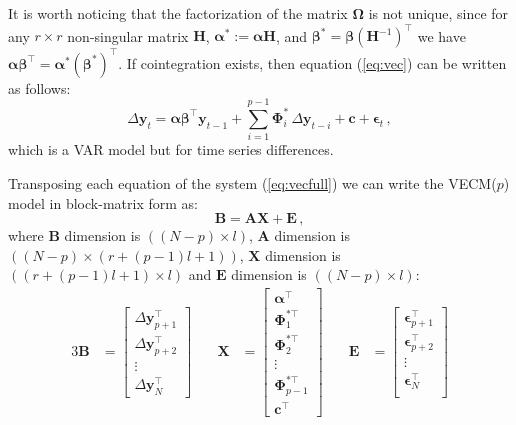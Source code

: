 \documentclass[twocolumn]{svjour3}          %
\begin{document}
It is worth noticing that the factorization of the matrix
$\boldsymbol\Omega$ is not unique, since for any $r \times r$
non-singular matrix $\mathbf{H}$, $\boldsymbol{\alpha}^*:=\boldsymbol{\alpha}\mathbf{H}$,
and $\boldsymbol{\beta}^*=\boldsymbol{\beta}(\mathbf{H}^{-1})^\top$ we have
$\boldsymbol{\alpha\beta}^\top=\boldsymbol{\alpha}^*(\boldsymbol{\beta}^*)^\top$.
If cointegration exists, then equation (\ref{eq:vec}) can be written
as follows:
\begin{equation}\label{eq:vecfull}
\Delta\mathbf{y}_t 
= \boldsymbol{\alpha\beta}^\top\mathbf{y}_{t-1} 
  + \sum_{i=1}^{p-1}\boldsymbol{\Phi}_i^*\,\Delta\mathbf{y}_{t-i}
  + \mathbf{c} + \boldsymbol{\epsilon}_t\,,
\end{equation}
\noindent
which is a VAR model but for time series differences.


Transposing each equation of the system (\ref{eq:vecfull}) we can write
the VECM($p$) model in block-matrix form as:
\begin{equation}\label{eq:vareq}
\mathbf{B} = 
\mathbf{A} \mathbf{X} + 
\mathbf{E} \, , 
\end{equation}
%
\noindent where $\mathbf{B}$ dimension is $((N-p)\times l)$, $\mathbf{A}$
dimension is $((N-p)\times(r+(p-1)l +1))$, $\mathbf{X}$ dimension is $((r+(p-1)l
+1)\times l)$ and $\mathbf{E}$ dimension is $((N-p)\times l)$:
%
\begin{alignat}{3}
\mathbf{B}
&= \begin{bmatrix}
   \Delta\mathbf{y}_{p+1}^\top \\
   \Delta\mathbf{y}_{p+2}^\top \\
   \vdots \\
   \Delta\mathbf{y}_N^\top
   \end{bmatrix}
&\quad
\mathbf{X}
&= \begin{bmatrix}
   \boldsymbol{\alpha}^\top \\
   \boldsymbol{\Phi}_1^{*\top} \\
   \boldsymbol{\Phi}_2^{*\top} \\
   \vdots \\
   \boldsymbol{\Phi}_{p-1}^{*\top} \\
   \mathbf{c}^\top
   \end{bmatrix}
&\quad
\mathbf{E}
&= \begin{bmatrix}
   \boldsymbol{\epsilon}_{p+1}^\top \\
   \boldsymbol{\epsilon}_{p+2}^\top \\
   \vdots \\
   \boldsymbol{\epsilon}_N^\top \\
   \end{bmatrix}
\end{alignat}
\end{document}
